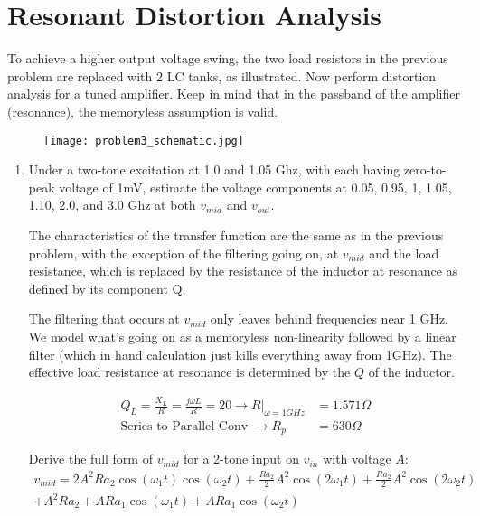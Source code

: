 \section{Resonant Distortion Analysis}
{\color{blue} To achieve a higher output voltage swing, the two load resistors in the previous problem are replaced with 2 LC tanks, as illustrated.
Now perform distortion analysis for a tuned amplifier.
Keep in mind that in the passband of the amplifier (resonance), the memoryless assumption is valid.}
\begin{figure}[H]
    \centering \texttt{[image: problem3\_schematic.jpg]}
\end{figure}
\begin{enumerate}[label=(\alph*)]
    \item {\color{blue} Under a two-tone excitation at 1.0 and 1.05 Ghz, with each having zero-to-peak voltage of 1mV, estimate the voltage components at 0.05, 0.95, 1, 1.05, 1.10, 2.0, and 3.0 Ghz at both $v_{mid}$ and $v_{out}$.}

    The characteristics of the transfer function are the same as in the previous problem, with the exception of the filtering going on, at $v_{mid}$ and the load resistance, which is replaced by the resistance of the inductor at resonance as defined by its component Q.

    The filtering that occurs at $v_{mid}$ only leaves behind frequencies near 1 GHz.
    We model what's going on as a memoryless non-linearity followed by a linear filter (which in hand calculation just kills everything away from 1GHz).
    The effective load resistance at resonance is determined by the $Q$ of the inductor.

    \begin{align*}
        Q_L = \frac{X_L}{R} = \frac{j \omega L}{R} = 20 \rightarrow R \rvert_{\omega = 1GHz} &= 1.571 \Omega \\
        \text{Series to Parallel Conv } \rightarrow R_p &= 630 \Omega
    \end{align*}

    Derive the full form of $v_{mid}$ for a 2-tone input on $v_{in}$ with voltage $A$:
    \begin{align*}
        v_{mid} = 2 A^{2} R a_{2} \cos{\left (\omega_1 t \right )} \cos{\left (\omega_2 t \right )} + \frac{R a_{2}}{2} A^{2} \cos{\left (2 \omega_1 t \right )} + \frac{R a_{2}}{2} A^{2} \cos{\left (2 \omega_2 t \right )} \\ + A^{2} R a_{2} + A R a_{1} \cos{\left (\omega_1 t \right )} + A R a_{1} \cos{\left (\omega_2 t \right )}
    \end{align*}


\end{enumerate}
